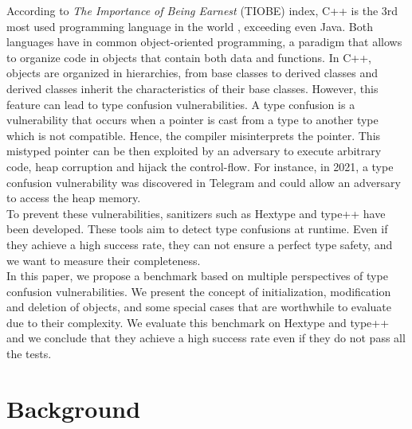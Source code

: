 \documentclass[a4paper,11pt,oneside]{report}
\begin{document}
According to \textit{The Importance of Being Earnest} (TIOBE) index, 
C++ is the 3rd most used programming language in the world \cite{tiobe}, 
exceeding even Java. Both languages have in common object-oriented programming,
a paradigm that allows to organize code in objects that contain
both data and functions. In C++, objects are organized in hierarchies, 
from base classes to derived classes and derived classes inherit 
the characteristics of their base classes. However, this feature can lead to
type confusion vulnerabilities. A type confusion is a vulnerability that occurs 
when a pointer is cast from a type to another type which is not compatible. 
Hence, the compiler misinterprets the pointer. This mistyped pointer can be then 
exploited by an adversary to execute arbitrary code, heap corruption and hijack the control-flow.
For instance, in 2021, a type confusion vulnerability was discovered in Telegram\cite{telegram_cve} 
and could allow an adversary to access the heap memory.\\
To prevent these vulnerabilities, sanitizers such as Hextype\cite{hextype} and type++\cite{typepp} have been developed.
These tools aim to detect type confusions at runtime. Even if they achieve a high success rate, 
they can not ensure a perfect type safety, and we want to measure their completeness.\\
In this paper, we propose a benchmark based on multiple perspectives of type confusion vulnerabilities.
We present the concept of initialization, modification and deletion of objects, and some special cases that are
worthwhile to evaluate due to their complexity. We evaluate this benchmark on Hextype and type++ and we conclude that
they achieve a high success rate even if they do not pass all the tests. 


\chapter{Background}
\end{document}
